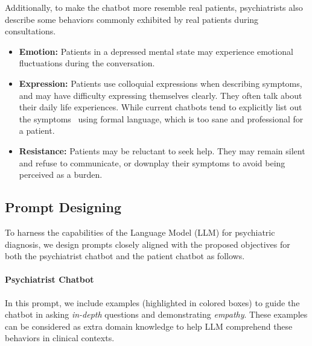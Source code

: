 Additionally, to make the chatbot more resemble real patients, psychiatrists also describe some behaviors commonly exhibited by real patients during consultations. 
\begin{itemize}
    \item \textbf{Emotion:} Patients in a depressed mental state may experience emotional fluctuations during the conversation.
    \item \textbf{Expression:} Patients use colloquial expressions when describing symptoms, and may have difficulty expressing themselves clearly. They often talk about their daily life experiences. While current chatbots tend to explicitly list out the symptoms~\cite{Llanos2021Lessons} using formal language, which is too sane and professional for a patient.
    \item \textbf{Resistance:} Patients may be reluctant to seek help. They may remain silent and refuse to communicate, or downplay their symptoms to avoid being perceived as a burden. 
\end{itemize}

\subsection{Prompt Designing}
\label{sec:prompt}
To harness the capabilities of the Language Model (LLM) for psychiatric diagnosis, we design prompts closely aligned with the proposed objectives for both the psychiatrist chatbot and the patient chatbot as follows.
\paragraph{Psychiatrist Chatbot} In this prompt, we include examples (highlighted in colored boxes) to guide the chatbot in asking \textit{in-depth} questions and demonstrating \textit{empathy}. These examples can be considered as extra domain knowledge to help LLM comprehend these behaviors in clinical contexts.

